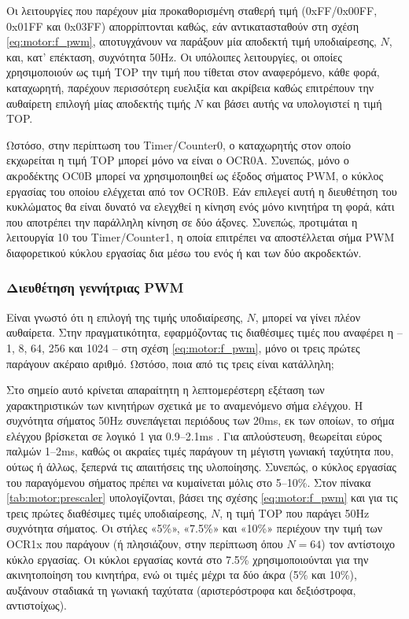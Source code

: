 Οι λειτουργίες που παρέχουν μία προκαθορισμένη σταθερή τιμή (0xFF\slash 0x00FF,
0x01FF και 0x03FF) απορρίπτονται καθώς, εάν αντικατασταθούν στη σχέση
\eqref{eq:motor:f_pwm}, αποτυγχάνουν να παράξουν μία αποδεκτή τιμή υποδιαίρεσης,
$N$, και, κατ' επέκταση, συχνότητα 50Hz. Οι υπόλοιπες λειτουργίες, οι οποίες
χρησιμοποιούν ως τιμή TOP την τιμή που τίθεται στον αναφερόμενο, κάθε φορά,
καταχωρητή, παρέχουν περισσότερη ευελιξία και ακρίβεια καθώς επιτρέπουν την
αυθαίρετη επιλογή μίας αποδεκτής τιμής $N$ και βάσει αυτής να υπολογιστεί η τιμή
TOP.

Ωστόσο, στην περίπτωση του \textenglish{Timer\slash Counter0}, ο καταχωρητής
στον οποίο εκχωρείται η τιμή TOP μπορεί μόνο να είναι ο OCR0A. Συνεπώς, μόνο ο
ακροδέκτης OC0B μπορεί να χρησιμοποιηθεί ως έξοδος σήματος PWM, ο κύκλος
εργασίας του οποίου ελέγχεται από τον OCR0B. Εάν επιλεγεί αυτή η διευθέτηση του
κυκλώματος θα είναι δυνατό να ελεγχθεί η κίνηση ενός μόνο κινητήρα τη φορά,
κάτι που αποτρέπει την παράλληλη κίνηση σε δύο άξονες. Συνεπώς, προτιμάται η
λειτουργία 10 του \textenglish{Timer\slash Counter1}, η οποία επιτρέπει να
αποστέλλεται σήμα PWM διαφορετικού κύκλου εργασίας δια μέσω του ενός ή και των
δύο ακροδεκτών.


\subsubsection{Διευθέτηση γεννήτριας PWM}

Είναι γνωστό ότι η επιλογή της τιμής υποδιαίρεσης, $N$, μπορεί να γίνει πλέον
αυθαίρετα. Στην πραγματικότητα, εφαρμόζοντας τις διαθέσιμες τιμές που αναφέρει η
\textcite[109]{atmel13} -- 1, 8, 64, 256 και 1024 -- στη σχέση
\eqref{eq:motor:f_pwm}, μόνο οι τρεις πρώτες παράγουν ακέραιο αριθμό. Ωστόσο,
ποια από τις τρεις είναι κατάλληλη;

Στο σημείο αυτό κρίνεται απαραίτητη η λεπτομερέστερη εξέταση των χαρακτηριστικών
των κινητήρων σχετικά με το αναμενόμενο σήμα ελέγχου. Η συχνότητα σήματος 50Hz
συνεπάγεται περιόδους των 20ms, εκ των οποίων, το σήμα ελέγχου βρίσκεται σε
λογικό 1 για 0.9--2.1ms \parencite{hitec02}. Για απλούστευση, θεωρείται εύρος
παλμών 1--2ms, καθώς οι ακραίες τιμές παράγουν τη μέγιστη γωνιακή ταχύτητα που,
ούτως ή άλλως, ξεπερνά τις απαιτήσεις της υλοποίησης. Συνεπώς, ο κύκλος εργασίας
του παραγόμενου σήματος πρέπει να κυμαίνεται μόλις στο 5--10\%. Στον πίνακα
\ref{tab:motor:prescaler} υπολογίζονται, βάσει της σχέσης \eqref{eq:motor:f_pwm}
και για τις τρεις πρώτες διαθέσιμες τιμές υποδιαίρεσης, $N$, η τιμή TOP που
παράγει 50Hz συχνότητα σήματος. Οι στήλες «5\%», «7.5\%» και «10\%» περιέχουν
την τιμή των OCR1x που παράγουν (ή πλησιάζουν, στην περίπτωση όπου $N = 64$) τον
αντίστοιχο κύκλο εργασίας. Οι κύκλοι εργασίας κοντά στο 7.5\% χρησιμοποιούνται
για την ακινητοποίηση του κινητήρα, ενώ οι τιμές μέχρι τα δύο άκρα (5\% και
10\%), αυξάνουν σταδιακά τη γωνιακή ταχύτατα (αριστερόστροφα και δεξιόστροφα,
αντιστοίχως).

